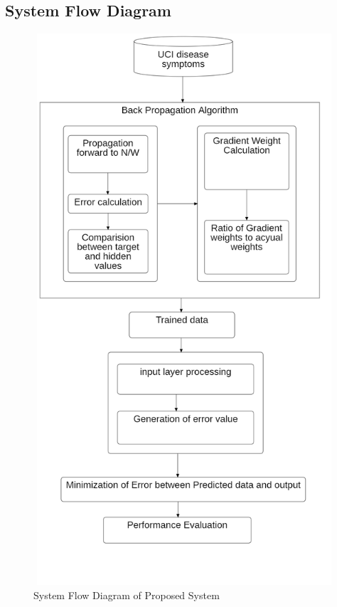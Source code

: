 \subsection{System Flow Diagram}
\begin{figure}[H]
\begin{center}
    
\includegraphics[width=140mm,height=205mm]{images/flow.png}
 \caption{System Flow Diagram of Proposed System}
 \end{center}                
\end{figure}

